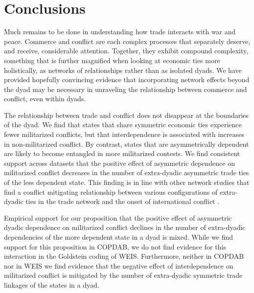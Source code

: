\documentclass[12pt]{article}
\theoremstyle{hypothesis}
\begin{document}
\section*{Conclusions}

Much remains to be done in understanding how trade interacts with war and peace. Commerce and conflict are each complex processes that separately deserve, and receive, considerable attention. Together, they exhibit compound complexity, something that is further magnified when looking at economic ties more holistically, as networks of relationships rather than as isolated dyads. We have provided hopefully convincing evidence that incorporating network effects beyond the dyad may be necessary in unraveling the relationship between commerce and conflict, even within dyads.

The relationship between trade and conflict does not disappear at the boundaries of the dyad. We find that states that share symmetric economic ties experience fewer militarized conflicts, but that interdependence is associated with increases in non-militarized conflict. By contrast, states that are asymmetrically dependent are likely to become entangled in more militarized contests. We find consistent support across datasets that the positive effect of asymmetric dependence on militarized conflict decreases in the number of extra-dyadic asymmetric trade ties of the less dependent state. This finding is in line with other network studies that find a conflict mitigating relationship between various configurations of extra-dyadic ties in the trade network and the onset of international conflict \citep{Dorussen:2010,Kinne:2012,Kinne:2014}.

Empirical support for our proposition that the positive effect of asymmetric dyadic dependence on militarized conflict declines in the number of extra-dyadic dependencies of the more dependent state in a dyad is mixed. While we find support for this proposition in COPDAB, we do not find evidence for this interaction in the Goldstein coding of WEIS. Furthermore, neither in COPDAB nor in WEIS we find evidence that the negative effect of interdependence on militarized conflict is mitigated by the number of extra-dyadic symmetric trade linkages of the states in a dyad.
\end{document}
